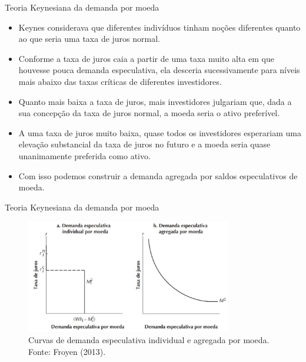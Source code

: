 \documentclass[10pt]{beamer}
\begin{document}
\begin{frame}{Teoria Keynesiana da demanda por moeda}
    \begin{itemize}
        \item Keynes considerava que diferentes indivíduos tinham noções diferentes quanto ao que seria uma taxa de juros normal.
    \bigskip
    \item Conforme a taxa de juros caia a partir de uma taxa muito alta em que houvesse pouca demanda especulativa, ela desceria sucessivamente para níveis mais abaixo das taxas críticas de diferentes investidores.
    \bigskip
    \item Quanto mais baixa a taxa de juros, mais investidores julgariam que, dada a sua concepção da taxa de juros normal, a moeda seria o ativo preferível.
    \bigskip
    \item A uma taxa de juros muito baixa, quase todos os investidores esperariam uma elevação substancial da taxa de juros no futuro e a moeda seria quase unanimamente preferida como ativo.
    \bigskip
    \item Com isso podemos construir a demanda agregada por saldos especulativos de moeda.
    \end{itemize}
\end{frame}

\begin{frame}{Teoria Keynesiana da demanda por moeda}
\begin{figure}
    \centering
    \includegraphics[width=0.8\textwidth]{./figures/aula092_fig2.JPG}
    \caption{Curvas de demanda especulativa individual e agregada por moeda. Fonte: Froyen (2013).}
    \label{fig2}
\end{figure}
\end{frame}
\end{document}
